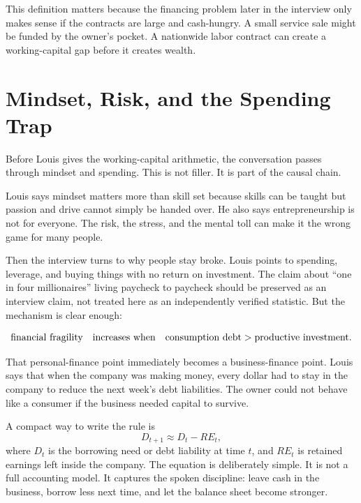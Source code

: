 This definition matters because the financing problem later in the interview only makes sense if the contracts are large and cash-hungry. A small service sale might be funded by the owner's pocket. A nationwide labor contract can create a working-capital gap before it creates wealth.

\section{Mindset, Risk, and the Spending Trap}

Before Louis gives the working-capital arithmetic, the conversation passes through mindset and spending. This is not filler. It is part of the causal chain.

Louis says mindset matters more than skill set because skills can be taught but passion and drive cannot simply be handed over. He also says entrepreneurship is not for everyone. The risk, the stress, and the mental toll can make it the wrong game for many people.

Then the interview turns to why people stay broke. Louis points to spending, leverage, and buying things with no return on investment. The claim about ``one in four millionaires'' living paycheck to paycheck should be preserved as an interview claim, not treated here as an independently verified statistic. But the mechanism is clear enough:

\begin{equation}
\text{financial fragility}
\quad\hbox{increases when}\quad
\text{consumption debt} > \text{productive investment}.
\end{equation}

That personal-finance point immediately becomes a business-finance point. Louis says that when the company was making money, every dollar had to stay in the company to reduce the next week's debt liabilities. The owner could not behave like a consumer if the business needed capital to survive.

A compact way to write the rule is
\begin{equation}
D_{t+1} \approx D_t - RE_t,
\end{equation}
where \(D_t\) is the borrowing need or debt liability at time \(t\), and \(RE_t\) is retained earnings left inside the company. The equation is deliberately simple. It is not a full accounting model. It captures the spoken discipline: leave cash in the business, borrow less next time, and let the balance sheet become stronger.

